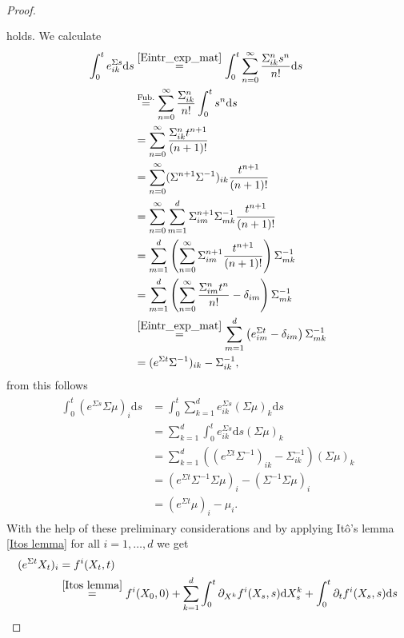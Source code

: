\documentclass[11pt,titlepage]{article}
\theoremstyle{definition}
\theoremstyle{remark}
\begin{document}
\begin{proof}
\begin{align}
\begin{split}
			\end{split}			
		\end{align}
		holds. We calculate
		\begin{align*}
			\int_0^t e^{\Sigma s}_{ik}\mathrm{d}s &\overset{\ref{Eintr_exp_mat}}{=} \int_0^t \sum_{n=0}^{\infty}\frac{\Sigma^n_{ik}s^n}{n!} \mathrm{d}s\\
			&\overset{\text{Fub.}}{=} \sum_{n=0}^{\infty}\frac{\Sigma^n_{ik}}{n!}\int_0^t s^n \mathrm{d}s\\
			&= \sum_{n=0}^{\infty}\frac{\Sigma^n_{ik}t^{n+1}}{(n+1)!}\\
			&= \sum_{n=0}^{\infty}(\Sigma^{n+1}\Sigma^{-1})_{ik}\frac{t^{n+1}}{(n+1)!}\\
			&= \sum_{n=0}^{\infty}\sum_{m=1}^d\Sigma^{n+1}_{im}\Sigma^{-1}_{mk}\frac{t^{n+1}}{(n+1)!}\\
			&= \sum_{m=1}^d\left(\sum_{n=0}^{\infty}\Sigma^{n+1}_{im}\frac{t^{n+1}}{(n+1)!}\right)\Sigma^{-1}_{mk}\\
			&= \sum_{m=1}^d\left(\sum_{n=0}^{\infty}\frac{\Sigma^{n}_{im}t^{n}}{n!}-\delta_{im}\right)\Sigma^{-1}_{mk}\\
			&\overset{\ref{Eintr_exp_mat}}{=} \sum_{m=1}^d\left(e^{\Sigma t}_{im}-\delta_{im}\right)\Sigma^{-1}_{mk}\\
			&= (e^{\Sigma t}\Sigma^{-1})_{ik} -\Sigma^{-1}_{ik},
		\end{align*}
		from this follows
		\begin{align}
			\begin{split}
				\int_0^t (e^{\Sigma s}\Sigma \mu)_i\mathrm{d}s
				&= \int_0^t \sum_{k=1}^d e^{\Sigma s}_{ik}(\Sigma\mu)_k\mathrm{d}s\\
				&= \sum_{k=1}^d \int_0^t e^{\Sigma s}_{ik} \mathrm{d}s (\Sigma\mu)_k\\
				&= \sum_{k=1}^d \left((e^{\Sigma t}\Sigma^{-1})_{ik} -\Sigma^{-1}_{ik}\right) (\Sigma\mu)_k\\
				&= (e^{\Sigma t}\Sigma^{-1}\Sigma\mu)_i -(\Sigma^{-1}\Sigma\mu)_i\\
				&= (e^{\Sigma t}\mu)_i -\mu_i. \label{NR:ito2}
			\end{split}
		\end{align}
		With the help of these preliminary considerations and by applying Itô's lemma \ref{Itos lemma} 
		for all $i=1,\ldots,d$ we get
		\begin{align*}
			(e^{\Sigma t}X_t)_i &= f^i(X_t,t) \\
			&\overset{\ref{Itos lemma}}{=} f^i(X_0,0) +\sum_{k=1}^d \int_0^t 
			\partial_{X^k} f^i(X_s,s)\mathrm{d}X^k_s +\int_0^t \partial_t f^i(X_s,s)\mathrm{d}s\\

\end{align*}
\end{proof}
\end{document}
